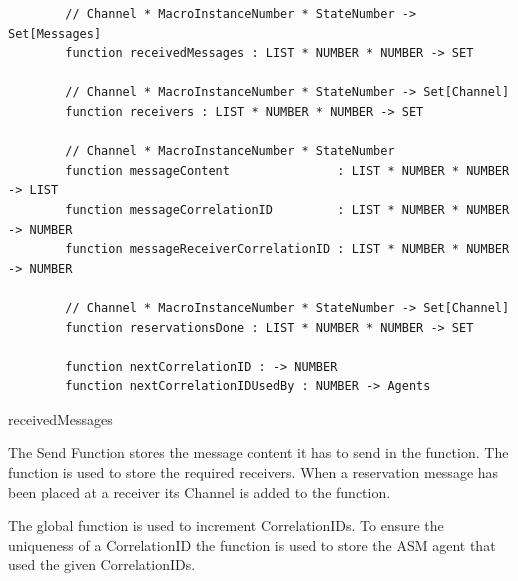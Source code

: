 \begin{listing}[H]
	\begin{verbatim}
		// Channel * MacroInstanceNumber * StateNumber -> Set[Messages]
		function receivedMessages : LIST * NUMBER * NUMBER -> SET
		
		// Channel * MacroInstanceNumber * StateNumber -> Set[Channel]
		function receivers : LIST * NUMBER * NUMBER -> SET
		
		// Channel * MacroInstanceNumber * StateNumber
		function messageContent               : LIST * NUMBER * NUMBER -> LIST
		function messageCorrelationID         : LIST * NUMBER * NUMBER -> NUMBER
		function messageReceiverCorrelationID : LIST * NUMBER * NUMBER -> NUMBER
		
		// Channel * MacroInstanceNumber * StateNumber -> Set[Channel]
		function reservationsDone : LIST * NUMBER * NUMBER -> SET
		
		function nextCorrelationID : -> NUMBER
		function nextCorrelationIDUsedBy : NUMBER -> Agents
	\end{verbatim}
	\caption{receivedMessages}
	\label{lst:shortasm:receivedMessages}
\end{listing}


The Send Function stores the message content it has to send in the
 function. The  function is
used to store the required receivers. When a reservation message has been
placed at a receiver its Channel is added to the 
function.

The global function  is used to increment
CorrelationIDs. To ensure the uniqueness of a CorrelationID the
 function is used to store the ASM agent
that used the given CorrelationIDs.


